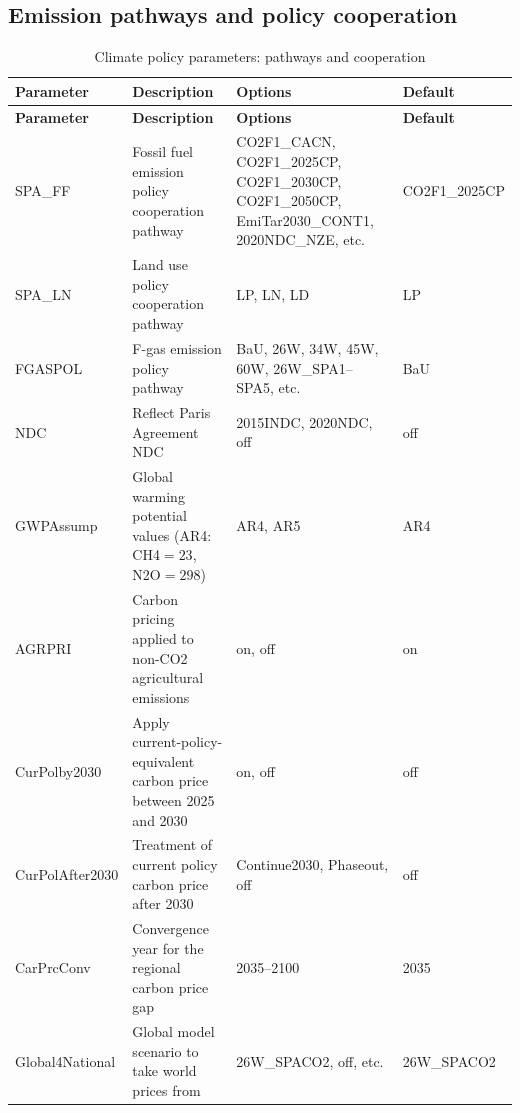 \documentclass[10pt,a4paper,titlepage,dvipdfmx]{book}
\begin{document}
\subsection{Emission pathways and policy cooperation}
\begin{longtable}{|p{}|p{}|p{}|p{}|}
\caption{Climate policy parameters: pathways and cooperation}\label{tab:sp-clp-path}\\
\hline
\textbf{Parameter} & \textbf{Description} & \textbf{Options} & \textbf{Default} \\ \hline
\endfirsthead
\hline
\textbf{Parameter} & \textbf{Description} & \textbf{Options} & \textbf{Default} \\ \hline
\endhead
\hline
\endfoot
SPA\_FF & Fossil fuel emission policy cooperation pathway & CO2F1\_CACN, CO2F1\_2025CP, CO2F1\_2030CP, CO2F1\_2050CP, EmiTar2030\_CONT1, 2020NDC\_NZE, etc. & CO2F1\_2025CP \\ \hline
SPA\_LN & Land use policy cooperation pathway & LP, LN, LD & LP \\ \hline
FGASPOL & F-gas emission policy pathway & BaU, 26W, 34W, 45W, 60W, 26W\_SPA1--SPA5, etc. & BaU \\ \hline
NDC & Reflect Paris Agreement NDC & 2015INDC, 2020NDC, off & off \\ \hline
GWPAssump & Global warming potential values (AR4: CH4$=23$, N2O$=298$) & AR4, AR5 & AR4 \\ \hline
AGRPRI & Carbon pricing applied to non-CO2 agricultural emissions & on, off & on \\ \hline
CurPolby2030 & Apply current-policy-equivalent carbon price between 2025 and 2030 & on, off & off \\ \hline
CurPolAfter2030 & Treatment of current policy carbon price after 2030 & Continue2030, Phaseout, off & off \\ \hline
CarPrcConv & Convergence year for the regional carbon price gap & 2035--2100 & 2035 \\ \hline
Global4National & Global model scenario to take world prices from & 26W\_SPACO2, off, etc. & 26W\_SPACO2 \\ \hline
\end{longtable}
\end{document}
